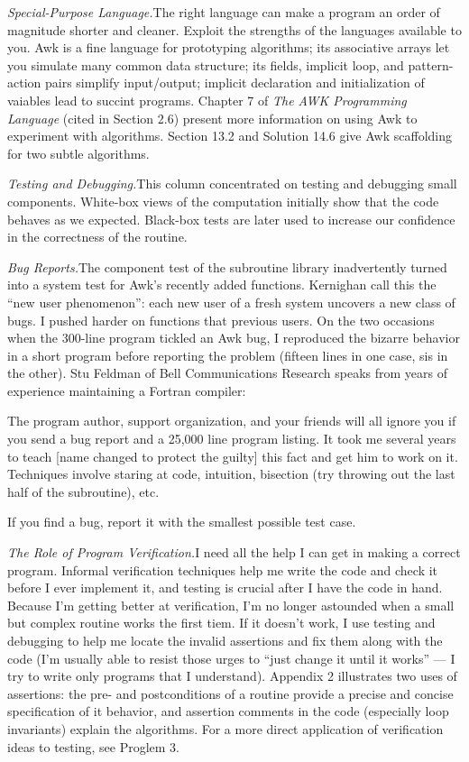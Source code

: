 {\it Special-Purpose Language.}\quad The right language can make a program an
order of magnitude shorter and cleaner. Exploit the strengths of the languages
available to you. Awk is a fine language for prototyping algorithms; its
associative arrays let you simulate many common data structure; its fields,
implicit loop, and pattern-action pairs simplify input/output; implicit
declaration and initialization of vaiables lead to succint programs. Chapter 7
of {\sl The AWK Programming Language\/} (cited in Section 2.6) present more
information on using Awk to experiment with algorithms. Section 13.2 and
Solution 14.6 give Awk scaffolding for two subtle algorithms.

{\it Testing and Debugging.}\quad This column concentrated on testing and
debugging small components. White-box views of the computation initially show
that the code behaves as we expected. Black-box tests are later used to
increase our confidence in the correctness of the routine.

{\it Bug Reports.}\quad The component test of the subroutine library
inadvertently turned into a system test for Awk's recently added functions.
Kernighan call this the ``new user phenomenon'': each new user of a fresh
system uncovers a new class of bugs. I pushed harder on functions that previous
users. On the two occasions when the 300-line program tickled an Awk bug, I
reproduced the bizarre behavior in a short program before reporting the problem
(fifteen lines in one case, sis in the other). Stu Feldman of Bell
Communications Research speaks from years of experience maintaining a Fortran
compiler:

{\medskip\more
The program author, support organization, and your friends will all ignore you
if you send a bug report and a 25{,}000 line program listing. It took me several
years to teach [name changed to protect the guilty] this fact and get him to
work on it. Techniques involve staring at code, intuition, bisection (try
throwing out the last half of the subroutine), etc.
\medskip}

\noindent If you find a bug, report it with the smallest possible test case.

{\it The Role of Program Verification.}\quad I need all the help I can get in
making a correct program. Informal verification techniques help me write the
code and check it before I ever implement it, and testing is crucial after I
have the code in hand. Because I'm getting better at verification, I'm no longer
astounded when a small but complex routine works the first tiem. If it doesn't
work, I use testing and debugging to help me locate the invalid assertions and
fix them along with the code (I'm usually able to resist those urges to ``just
change it until it works'' --- I try to write only programs that I understand).
Appendix 2 illustrates two uses of assertions: the pre- and postconditions of a
routine provide a precise and concise specification of it behavior, and
assertion comments in the code (especially loop invariants) explain the
algorithms. For a more direct application of verification ideas to testing, see
Proglem 3.

